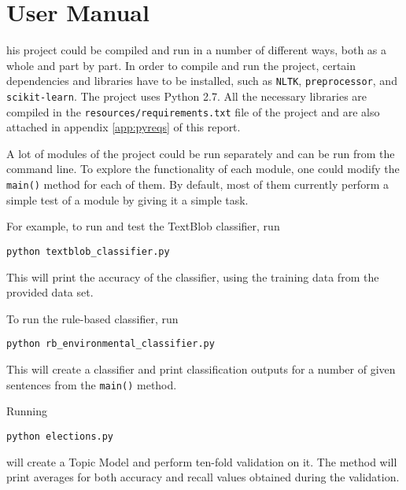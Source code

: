 
\chapter{User Manual}
\label{app:manual}

his project could be compiled and run in a number of different ways, both as a whole and part by part. In order to compile and run the project, certain dependencies and libraries have to be installed, such as \texttt{NLTK}, \texttt{preprocessor}, and \texttt{scikit-learn}. The project uses Python 2.7. All the necessary libraries are compiled in the \texttt{resources/requirements.txt} file of the project and are also attached in appendix \ref{app:pyreqs} of this report. 

A lot of modules of the project could be run separately and can be run from the command line. To explore the functionality of each module, one could modify the \texttt{main()} method for each of them. By default, most of them currently perform a simple test of a module by giving it a simple task.

\par For example, to run and test the TextBlob classifier, run

\begin{center}
\texttt{python textblob\_classifier.py}
\end{center}

This will print the accuracy of the classifier, using the training data from the provided data set.

\par To run the rule-based classifier, run

\begin{center}
\texttt{python rb\_environmental\_classifier.py}
\end{center}

This will create a classifier and print classification outputs for a number of given sentences from the \texttt{main()} method.

\par
Running
\begin{center}
\texttt{python elections.py}
\end{center}

will create a Topic Model and perform ten-fold validation on it. The method will print averages for both accuracy and recall values obtained during the validation.

